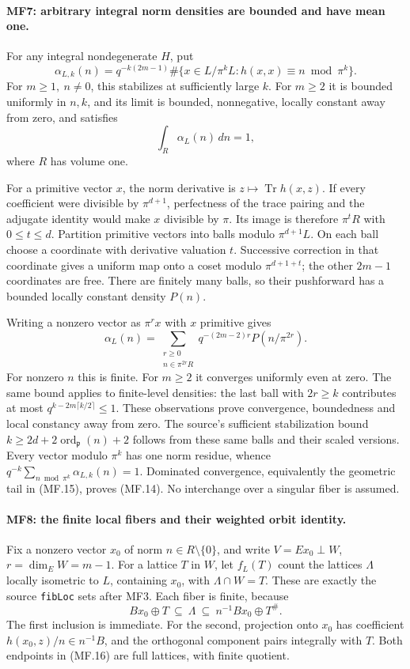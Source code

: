 \paragraph{MF7: arbitrary integral norm densities are bounded and have mean one.}
For any integral nondegenerate \(H\), put
\[
 \alpha_{L,k}(n)=q^{-k(2m-1)}
       \#\{x\in L/\pi^kL:h(x,x)\equiv n\bmod\pi^k\}.   \tag{MF.13}
\]
For \(m\ge1,\ n\ne0\), this stabilizes at sufficiently large \(k\).
For \(m\ge2\) it is bounded uniformly in \(n,k\), and its limit is
bounded, nonnegative, locally constant away from zero, and satisfies
\[
                         \int_R\alpha_L(n)\,dn=1,     \tag{MF.14}
\]
where \(R\) has volume one.

For a primitive vector \(x\), the norm derivative is
\(z\mapsto\operatorname{Tr}h(x,z)\).
If every coefficient were divisible by \(\pi^{d+1}\), perfectness of
the trace pairing and the adjugate identity would make \(x\)
divisible by \(\pi\). Its image is therefore \(\pi^tR\) with
\(0\le t\le d\). Partition primitive vectors into balls modulo
\(\pi^{d+1}L\). On each ball choose a coordinate with derivative
valuation \(t\). Successive correction in that coordinate gives a
uniform map onto a coset modulo \(\pi^{d+1+t}\); the other
\(2m-1\) coordinates are free. There are finitely many balls,
so their pushforward has a bounded locally constant density \(P(n)\).

Writing a nonzero vector as \(\pi^r x\) with \(x\) primitive gives
\[
 \alpha_L(n)=\sum_{\substack{r\ge0\\n\in\pi^{2r}R}}
       q^{-(2m-2)r}P(n/\pi^{2r}).                    \tag{MF.15}
\]
For nonzero \(n\) this is finite. For \(m\ge2\) it converges uniformly
even at zero. The same bound applies to finite-level densities:
the last ball with \(2r\ge k\) contributes at most
\(q^{k-2m\lceil k/2\rceil}\le1\).
These observations prove convergence, boundedness and local
constancy away from zero. The source's sufficient stabilization
bound \(k\ge2d+2\operatorname{ord}_{\mathfrak p}(n)+2\) follows
from these same balls and their scaled versions.
Every vector modulo \(\pi^k\) has one norm residue, whence
\(q^{-k}\sum_{n\bmod\pi^k}\alpha_{L,k}(n)=1\).
Dominated convergence, equivalently the geometric tail in (MF.15),
proves (MF.14). No interchange over a singular fiber is assumed.

\paragraph{MF8: the finite local fibers and their weighted orbit identity.}
Fix a nonzero vector \(x_0\) of norm \(n\in R\setminus\{0\}\), and
write \(V=Ex_0\perp W\), \(r=\dim_EW=m-1\).
For a lattice \(T\) in \(W\), let \(f_L(T)\) count the lattices
\(\Lambda\) locally isometric to \(L\), containing \(x_0\), with
\(\Lambda\cap W=T\). These are exactly the source \texttt{fibLoc}
sets after MF3. Each fiber is finite, because
\[
 Bx_0\oplus T\ \subseteq\ \Lambda\
                  \subseteq\ n^{-1}Bx_0\oplus T^\#.   \tag{MF.16}
\]
The first inclusion is immediate. For the second, projection onto
\(x_0\) has coefficient \(h(x_0,z)/n\in n^{-1}B\), and the
orthogonal component pairs integrally with \(T\).
Both endpoints in (MF.16) are full lattices, with finite quotient.

